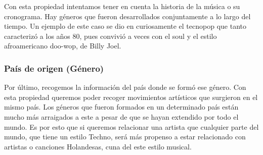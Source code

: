 Con esta propiedad intentamos tener en cuenta la historia de la música o su cronograma. Hay géneros que fueron desarrollados conjuntamente a lo largo del tiempo. Un ejemplo de este caso se dio en curiosamente el tecnopop que tanto caracterizó a los años 80, pues convivió a veces con el soul y el estilo afroamericano doo-wop, de Billy Joel.

\subsubsection*{País de origen (Género)}

Por último, recogemos la información del país donde se formó ese género. Con esta propiedad queremos poder recoger movimientos artísticos que surgieron en el mismo país. Los géneros que fueron formados en un determinado país están mucho más arraigados a este a pesar de que se hayan extendido por todo el mundo. Es por esto que si queremos relacionar una artista que cualquier parte del mundo, que tiene un estilo Techno, será más propenso a estar relacionado con artistas o canciones Holandesas, cuna del este estilo musical.